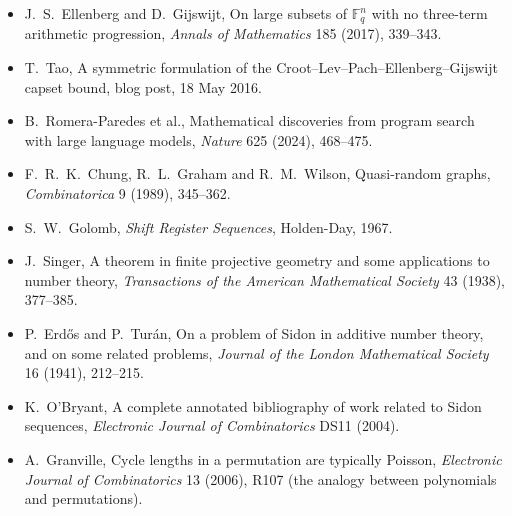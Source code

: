\begin{itemize}
(2017), 331--337.
\item J.~S.~Ellenberg and D.~Gijswijt, On large subsets of $\mathbb F_q^n$ with no three-term arithmetic progression, \emph{Annals of
Mathematics} 185 (2017), 339--343.
\item T.~Tao, A symmetric formulation of the Croot--Lev--Pach--Ellenberg--Gijswijt capset bound, blog post, 18 May 2016.
\item B.~Romera-Paredes et al., Mathematical discoveries from program search with large language models, \emph{Nature} 625 (2024),
468--475.
\item F.~R.~K.~Chung, R.~L.~Graham and R.~M.~Wilson, Quasi-random graphs, \emph{Combinatorica} 9 (1989), 345--362.
\item S.~W.~Golomb, \emph{Shift Register Sequences}, Holden-Day, 1967.
\item J.~Singer, A theorem in finite projective geometry and some applications to number theory, \emph{Transactions of the American
Mathematical Society} 43 (1938), 377--385.
\item P.~Erdős and P.~Turán, On a problem of Sidon in additive number theory, and on some related problems, \emph{Journal of the
London Mathematical Society} 16 (1941), 212--215.
\item K.~O'Bryant, A complete annotated bibliography of work related to Sidon sequences, \emph{Electronic Journal of Combinatorics}
DS11 (2004).
\item A.~Granville, Cycle lengths in a permutation are typically Poisson, \emph{Electronic Journal of Combinatorics} 13 (2006), R107
(the analogy between polynomials and permutations).
\end{itemize}
